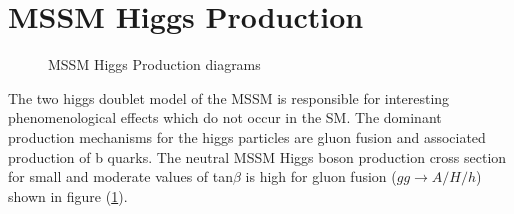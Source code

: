 \section{MSSM Higgs Production}

\begin{figure}[t]
\centering
  \begin{subfigure}[b]{.4\textwidth}
\caption[]{}
	\label{fig:ggA}
	\end{subfigure}	
   \begin{subfigure}[b]{.4\textwidth}

	\label{fig:bbA}

	\caption[]{}
    \end{subfigure}	
  	\caption[]
   	{MSSM Higgs Production diagrams}
	\label{fig:MSSMdiagrams}
\end{figure}
The two higgs doublet model of the MSSM is responsible for interesting
phenomenological effects which do not occur in the SM.
The dominant production mechanisms for the higgs particles are gluon
fusion and associated production of b quarks. 
The neutral MSSM Higgs boson production cross section
for small and moderate values of tan$\beta$ is high for 
gluon fusion ($gg\rightarrow A/H/h$) shown in figure (\ref{fig:ggA}). 

